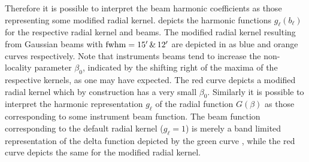  Therefore it is possible to interpret the beam harmonic coefficients as those representing some modified radial kernel.  depicts the harmonic functions $g_{\ell} (b_{\ell})$ for the respective radial kernel and beams.  The modified radial kernel resulting from Gaussian beams with ${\rm fwhm} =15' \,\&\, 12'$ are depicted in  as blue and orange curves respectively. Note that instruments  beams tend to increase the non-locality parameter $\beta_0$, indicated by the shifting right of the maxima of the respective kernels, as one may have expected. The red curve depicts a modified radial kernel which by construction has a very small $\beta_0$.  Similarly it is possible to interpret the harmonic representation $g_{\ell}$ of the radial function $G(\beta)$ as those corresponding to some instrument beam function. The beam function corresponding to the default radial kernel ($g_{\ell}=1$) is merely a band limited representation of the delta function depicted by the green curve , while the red curve depicts the same for the modified radial kernel.


